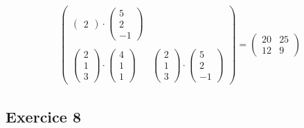 \documentclass[12pt]{article}
\begin{document}
\begin{enumerate}
\begin{enumerate}
\begin{align*}
\begin{pmatrix}
\begin{pmatrix}
                    2
                \end{pmatrix} \cdot
                \begin{pmatrix}
                    5 \\
                    2 \\
                    -1
                \end{pmatrix} \\ \\
                \begin{pmatrix}
                    2 \\
                    1 \\
                    3
                \end{pmatrix} \cdot
                \begin{pmatrix}
                    4 \\
                    1 \\
                    1
                \end{pmatrix} &
                \begin{pmatrix}
                    2 \\
                    1 \\
                    3
                \end{pmatrix} \cdot
                \begin{pmatrix}
                    5 \\
                    2 \\
                    -1
                \end{pmatrix}
            \end{pmatrix}
            = \begin{pmatrix}
                20 & 25 \\
                12 & 9
            \end{pmatrix}
        \end{align*}
    \end{enumerate}
\end{enumerate}

\subsection*{Exercice 8}
\end{document}
